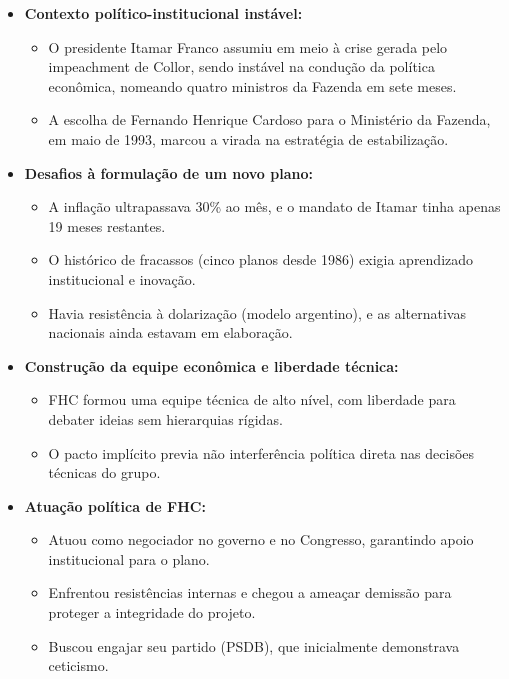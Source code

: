 \documentclass[a4paper,12pt]{article}[abntex2]
\begin{document}
\begin{itemize}

    \item \textbf{Contexto político-institucional instável:}
    \begin{itemize}
        \item O presidente Itamar Franco assumiu em meio à crise gerada pelo impeachment de Collor, sendo instável na condução da política econômica, nomeando quatro ministros da Fazenda em sete meses.
        \item A escolha de Fernando Henrique Cardoso para o Ministério da Fazenda, em maio de 1993, marcou a virada na estratégia de estabilização.
    \end{itemize}

    \item \textbf{Desafios à formulação de um novo plano:}
    \begin{itemize}
        \item A inflação ultrapassava 30\% ao mês, e o mandato de Itamar tinha apenas 19 meses restantes.
        \item O histórico de fracassos (cinco planos desde 1986) exigia aprendizado institucional e inovação.
        \item Havia resistência à dolarização (modelo argentino), e as alternativas nacionais ainda estavam em elaboração.
    \end{itemize}

    \item \textbf{Construção da equipe econômica e liberdade técnica:}
    \begin{itemize}
        \item FHC formou uma equipe técnica de alto nível, com liberdade para debater ideias sem hierarquias rígidas.
        \item O pacto implícito previa não interferência política direta nas decisões técnicas do grupo.
    \end{itemize}

    \item \textbf{Atuação política de FHC:}
    \begin{itemize}
        \item Atuou como negociador no governo e no Congresso, garantindo apoio institucional para o plano.
        \item Enfrentou resistências internas e chegou a ameaçar demissão para proteger a integridade do projeto.
        \item Buscou engajar seu partido (PSDB), que inicialmente demonstrava ceticismo.
    \end{itemize}


\end{itemize}
\end{document}

